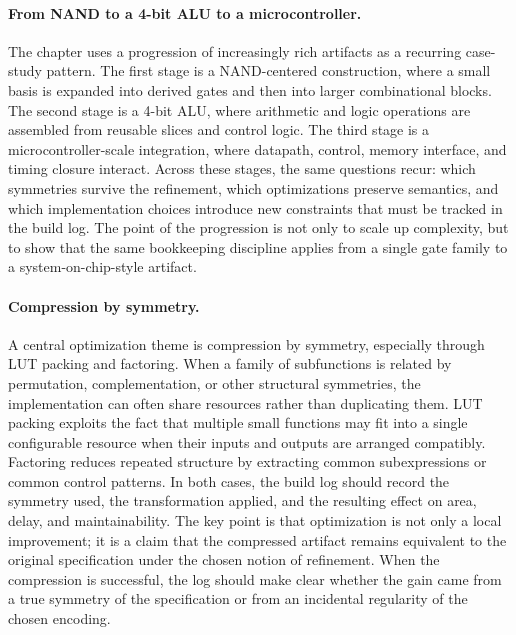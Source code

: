 \documentclass[11pt]{article}
\begin{document}
\paragraph{From NAND to a 4-bit ALU to a microcontroller.}
The chapter uses a progression of increasingly rich artifacts as a recurring case-study pattern. The first stage is a NAND-centered construction, where a small basis is expanded into derived gates and then into larger combinational blocks. The second stage is a 4-bit ALU, where arithmetic and logic operations are assembled from reusable slices and control logic. The third stage is a microcontroller-scale integration, where datapath, control, memory interface, and timing closure interact. Across these stages, the same questions recur: which symmetries survive the refinement, which optimizations preserve semantics, and which implementation choices introduce new constraints that must be tracked in the build log. The point of the progression is not only to scale up complexity, but to show that the same bookkeeping discipline applies from a single gate family to a system-on-chip-style artifact.

\paragraph{Compression by symmetry.}
A central optimization theme is compression by symmetry, especially through LUT packing and factoring. When a family of subfunctions is related by permutation, complementation, or other structural symmetries, the implementation can often share resources rather than duplicating them. LUT packing exploits the fact that multiple small functions may fit into a single configurable resource when their inputs and outputs are arranged compatibly. Factoring reduces repeated structure by extracting common subexpressions or common control patterns. In both cases, the build log should record the symmetry used, the transformation applied, and the resulting effect on area, delay, and maintainability. The key point is that optimization is not only a local improvement; it is a claim that the compressed artifact remains equivalent to the original specification under the chosen notion of refinement. When the compression is successful, the log should make clear whether the gain came from a true symmetry of the specification or from an incidental regularity of the chosen encoding.
\end{document}
